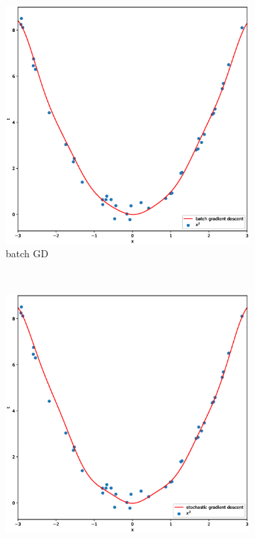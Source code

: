 \documentclass{article}
\begin{document}
\begin{figure}[t!]
    \centering
    \begin{subfigure}[b]{0.3\textwidth}
        \centering
        \includegraphics[width = \linewidth]{bgd_final.eps}
        \caption{batch GD}
    \end{subfigure}
    ~
    \begin{subfigure}[b]{0.3\textwidth}
        \centering
        \includegraphics[width = \linewidth]{sgd_final.eps}

\end{subfigure}
\end{figure}
\end{document}
